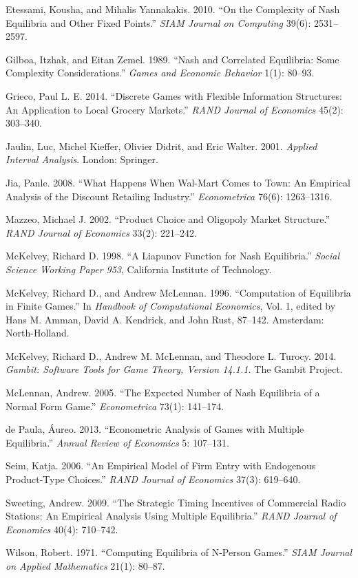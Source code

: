 \documentclass[11pt]{article}
\makeatletter
\newcommand{\boxspacing}{\kern\kvtcb@left@rule\kern\kvtcb@boxsep}
\newcommand{\prompt}[4]{
        {\ttfamily\llap{{\color{#2}[#3]:\hspace{3pt}#4}}\vspace{-\baselineskip}}
    }
\makeatother
\begin{document}
Etessami, Kousha, and Mihalis Yannakakis. 2010. ``On the Complexity of
Nash Equilibria and Other Fixed Points.'' \emph{SIAM Journal on
Computing} 39(6): 2531--2597.

Gilboa, Itzhak, and Eitan Zemel. 1989. ``Nash and Correlated Equilibria:
Some Complexity Considerations.'' \emph{Games and Economic Behavior}
1(1): 80--93.

Grieco, Paul L. E. 2014. ``Discrete Games with Flexible Information
Structures: An Application to Local Grocery Markets.'' \emph{RAND
Journal of Economics} 45(2): 303--340.

Jaulin, Luc, Michel Kieffer, Olivier Didrit, and Eric Walter. 2001.
\emph{Applied Interval Analysis}. London: Springer.

Jia, Panle. 2008. ``What Happens When Wal-Mart Comes to Town: An
Empirical Analysis of the Discount Retailing Industry.''
\emph{Econometrica} 76(6): 1263--1316.

Mazzeo, Michael J. 2002. ``Product Choice and Oligopoly Market
Structure.'' \emph{RAND Journal of Economics} 33(2): 221--242.

McKelvey, Richard D. 1998. ``A Liapunov Function for Nash Equilibria.''
\emph{Social Science Working Paper 953}, California Institute of
Technology.

McKelvey, Richard D., and Andrew McLennan. 1996. ``Computation of
Equilibria in Finite Games.'' In \emph{Handbook of Computational
Economics}, Vol. 1, edited by Hans M. Amman, David A. Kendrick, and John
Rust, 87--142. Amsterdam: North-Holland.

McKelvey, Richard D., Andrew M. McLennan, and Theodore L. Turocy. 2014.
\emph{Gambit: Software Tools for Game Theory, Version 14.1.1.} The
Gambit Project.

McLennan, Andrew. 2005. ``The Expected Number of Nash Equilibria of a
Normal Form Game.'' \emph{Econometrica} 73(1): 141--174.

de Paula, Áureo. 2013. ``Econometric Analysis of Games with Multiple
Equilibria.'' \emph{Annual Review of Economics} 5: 107--131.

Seim, Katja. 2006. ``An Empirical Model of Firm Entry with Endogenous
Product-Type Choices.'' \emph{RAND Journal of Economics} 37(3):
619--640.

Sweeting, Andrew. 2009. ``The Strategic Timing Incentives of Commercial
Radio Stations: An Empirical Analysis Using Multiple Equilibria.''
\emph{RAND Journal of Economics} 40(4): 710--742.

Wilson, Robert. 1971. ``Computing Equilibria of N-Person Games.''
\emph{SIAM Journal on Applied Mathematics} 21(1): 80--87.

    \begin{tcolorbox}[breakable, size=fbox, boxrule=1pt, pad at break*=1mm,colback=cellbackground, colframe=cellborder]
\prompt{In}{incolor}{ }{\boxspacing}
\begin{Verbatim}[commandchars=\\\{\}]

\end{Verbatim}
\end{tcolorbox}


    
    
    
\end{document}
